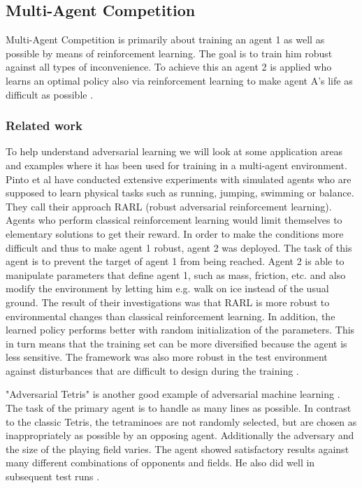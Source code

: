 \subsection{Multi-Agent Competition}

Multi-Agent Competition is primarily about training an agent 1 as well as possible by means of reinforcement learning. The goal is to train him robust against all types of inconvenience.
To achieve this an agent 2 is applied who learns an optimal policy also via reinforcement learning to make agent A's life as difficult as possible \cite{robustPinto2017Mar}.

\subsubsection{Related work}

To help understand adversarial learning we will look at some application areas and examples where it has been used for training in a multi-agent environment.\\

Pinto et al \cite{robustPinto2017Mar} have conducted extensive experiments with simulated agents who are supposed to learn physical tasks such as running, jumping, swimming or balance. They call their approach RARL (robust adversarial reinforcement learning). Agents who perform classical reinforcement learning would limit themselves to elementary solutions to get their reward. In order to make the conditions more difficult and thus to make agent 1 robust, agent 2 was deployed. The task of this agent is to prevent the target of agent 1 from being reached. Agent 2 is able to manipulate parameters that define agent 1, such as mass, friction, etc. and also modify the environment by letting him e.g. walk on ice instead of the usual ground.
The result of their investigations was that RARL is more robust to environmental changes than classical reinforcement learning. In addition, the learned policy performs better with random initialization of the parameters. This in turn means that the training set can be more diversified because the agent is less sensitive. The framework was also more robust in the test environment against disturbances that are difficult to design during the training \cite{robustPinto2017Mar}.

"Adversarial Tetris" is another good example of adversarial machine learning \cite{tetrisRovatsou2010May}. The task of the primary agent is to handle as many lines as possible. In contrast to the classic Tetris, the tetraminoes are not randomly selected, but are chosen as inappropriately as possible by an opposing agent. Additionally the adversary and the size of the playing field varies. 
The agent showed satisfactory results against many different combinations of opponents and fields. He also did well in subsequent test runs \cite{tetrisRovatsou2010May}.

